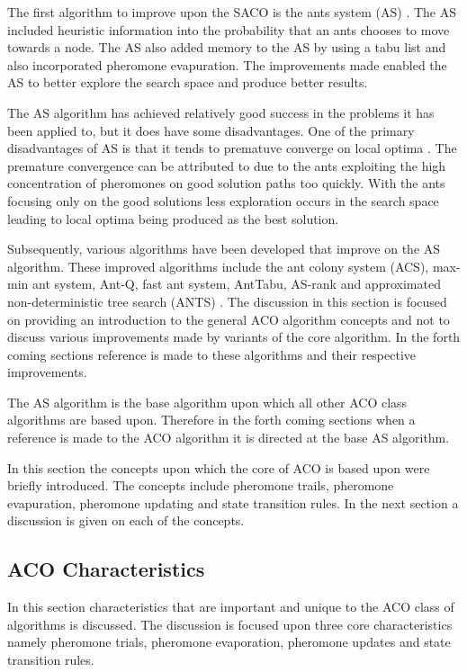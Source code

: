 The first algorithm to improve upon the SACO is the ants system (AS) \cite{CompuIntelligenceIntro,AntIntroTrends}. The AS included heuristic information into the probability that an ants chooses to move towards a node. The AS also added memory to the AS by using a tabu list and also incorporated pheromone evapuration. The improvements made enabled the AS to better explore the search space and produce better results\cite{CompuIntelligenceIntro,AntIntroTrends}. 

The AS algorithm has achieved relatively good success in the problems it has been applied to, but it does have some disadvantages\cite{ImpACOComplex,ACOSurvey}. One of the primary disadvantages of AS is that it tends to prematuve converge on local optima \cite{FundamentalSwarm,ImpACOComplex}. The premature convergence can be attributed to due to the ants exploiting the high concentration of pheromones on good solution paths too quickly\cite{FundamentalSwarm}. With the ants focusing only on the good solutions less exploration occurs in the search space leading to local optima being produced as the best solution\cite{FundamentalSwarm}.

Subsequently, various algorithms have been developed that improve on the AS algorithm. These improved algorithms include the ant colony system (ACS), max-min ant system, Ant-Q, fast ant system, AntTabu, AS-rank and approximated non-deterministic tree search (ANTS) \cite{CompuIntelligenceIntro,AntIntroTrends}. The discussion in this section is focused on providing an introduction to the general ACO algorithm concepts and not to discuss various improvements made by variants of the core algorithm. In the forth coming sections reference is made to these algorithms and their respective improvements.

The AS algorithm is the base algorithm upon which all other ACO class algorithms are based upon. Therefore in the forth coming sections when a reference is made to the ACO algorithm it is directed at the base AS algorithm.

In this section the concepts  upon which the core of ACO is based upon were briefly introduced. The concepts include pheromone trails, pheromone evapuration, pheromone updating and state transition rules. In the next section a discussion is given on each of the concepts.
\subsection{ACO Characteristics}
\label{sec:ACOcharacter}
In this section characteristics that are important and unique to the ACO class of algorithms is discussed. The discussion is focused upon three core characteristics namely pheromone trials, pheromone evaporation, pheromone updates and state transition rules.
